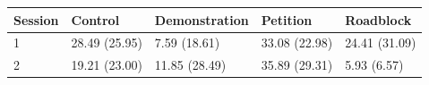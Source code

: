 \begin{table}[ht]
\centering
\begin{tabular}{lllll}
  \hline
Session & Control & Demonstration & Petition & Roadblock \\ 
  \hline
1 & 28.49 (25.95) & 7.59 (18.61) & 33.08 (22.98) & 24.41 (31.09) \\ 
  2 & 19.21 (23.00) & 11.85 (28.49) & 35.89 (29.31) & 5.93 (6.57) \\ 
   \hline
\end{tabular}
\end{table}
